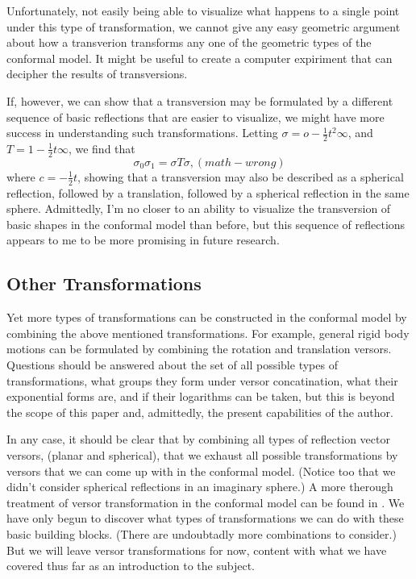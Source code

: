 \documentclass[12pt]{article}
\newcommand{\nvao}{o}
\newcommand{\nvai}{\infty}
\begin{document}
Unfortunately, not easily being able to visualize what happens to a single point
under this type of transformation, we cannot give any easy geometric argument
about how a transverion transforms any one of the geometric types of the conformal model.
It might be useful to create a computer expiriment that can decipher the results of
transversions.

If, however, we can show that a transversion may be formulated by a different
sequence of basic reflections that are easier to visualize, we might have more success
in understanding such transformations.  Letting $\sigma=\nvao-\frac{1}{2}t^2\nvai$,
and $T=1-\frac{1}{2}t\nvai$, we find that
\begin{equation*}
\sigma_0\sigma_1 = \sigma T\sigma, (math-wrong)
\end{equation*}
where $c=-\frac{1}{2}t$, showing that a transversion may also be described as
a spherical reflection, followed by a translation, followed by a spherical reflection
in the same sphere.  Admittedly, I'm no closer to an ability to visualize the transversion
of basic shapes in the conformal model than before, but this sequence of reflections
appears to me to be more promising in future research.

\subsection{Other Transformations}

Yet more types of transformations can be constructed in the conformal model
by combining the above mentioned transformations.  For example, general
rigid body motions can be formulated by combining the rotation and translation
versors.  Questions should be answered about the set of all possible types
of transformations, what groups they form under versor concatination, what
their exponential forms are, and if their logarithms can be taken, but
this is beyond the scope of this paper and, admittedly, the present capabilities of the author.

In any case, it should be clear that by combining all types of reflection vector versors, (planar and spherical),
that we exhaust all possible transformations by versors that we can come up with in the
conformal model.  (Notice too that we didn't consider spherical reflections in an imaginary sphere.)
A more therough treatment of versor transformation in the conformal model can be found in
\cite{dorst07}.
We have only begun to discover what types of transformations we
can do with these basic building blocks.  (There are undoubtadly more combinations to
consider.)  But we will leave versor transformations for now, content with what we have
covered thus far as an introduction to the subject.
\end{document}
